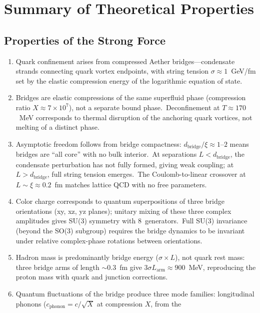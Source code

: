 ﻿\documentclass[12pt,letterpaper]{article}
\begin{document}
\section{Summary of Theoretical Properties}

\subsection{Properties of the Strong Force}

\begin{enumerate}[leftmargin=2em]
  \item Quark confinement arises from compressed Aether bridges---condensate
    strands connecting quark vortex endpoints, with string tension
    $\sigma \approx 1$~GeV/fm set by the elastic compression energy of the
    logarithmic equation of state.
  \item Bridges are elastic compressions of the same superfluid phase (compression
    ratio $X \approx 7 \times 10^7$), not a separate bound phase.\ Deconfinement
    at $T \approx 170$~MeV corresponds to thermal disruption of the anchoring quark
    vortices, not melting of a distinct phase.
  \item Asymptotic freedom follows from bridge compactness: $d_{\mathrm{bridge}}/\xi
    \approx 1$--$2$ means bridges are ``all core'' with no bulk interior.\ At
    separations $L < d_{\mathrm{bridge}}$, the condensate perturbation has not fully
    formed, giving weak coupling; at $L > d_{\mathrm{bridge}}$, full string tension
    emerges.\ The Coulomb-to-linear crossover at $L \sim \xi \approx 0.2$~fm matches
    lattice QCD with no free parameters.
  \item Color charge corresponds to quantum superpositions of three bridge
    orientations (xy, xz, yz planes); unitary mixing of these three complex
    amplitudes gives SU(3) symmetry with 8~generators.\ Full SU(3) invariance
    (beyond the SO(3) subgroup) requires the bridge dynamics to be invariant
    under relative complex-phase rotations between orientations.
  \item Hadron mass is predominantly bridge energy ($\sigma \times L$), not quark
    rest mass: three bridge arms of length $\sim$0.3~fm give $3\sigma L_{\mathrm{arm}}
    \approx 900$~MeV, reproducing the proton mass with quark and junction corrections.
  \item Quantum fluctuations of the bridge produce three mode families: longitudinal
    phonons ($c_{\mathrm{phonon}} = c/\sqrt{X}$ at compression $X$, from the

\end{enumerate}
\end{document}
